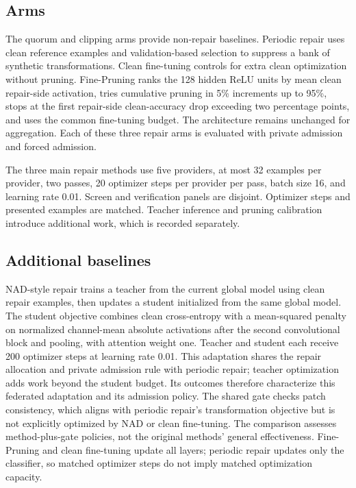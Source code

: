\documentclass[sigconf,review,anonymous]{acmart}
\begin{document}
\subsection{Arms}
The quorum and clipping arms provide non-repair baselines. Periodic repair uses clean reference examples and validation-based selection to suppress a bank of synthetic transformations. Clean fine-tuning controls for extra clean optimization without pruning. Fine-Pruning ranks the 128 hidden ReLU units by mean clean repair-side activation, tries cumulative pruning in 5\% increments up to 95\%, stops at the first repair-side clean-accuracy drop exceeding two percentage points, and uses the common fine-tuning budget. The architecture remains unchanged for aggregation. Each of these three repair arms is evaluated with private admission and forced admission.

The three main repair methods use five providers, at most 32 examples per provider, two passes, 20 optimizer steps per provider per pass, batch size 16, and learning rate 0.01. Screen and verification panels are disjoint. Optimizer steps and presented examples are matched. Teacher inference and pruning calibration introduce additional work, which is recorded separately.

\subsection{Additional baselines}
NAD-style repair trains a teacher from the current global model using clean repair examples, then updates a student initialized from the same global model. The student objective combines clean cross-entropy with a mean-squared penalty on normalized channel-mean absolute activations after the second convolutional block and pooling, with attention weight one. Teacher and student each receive 200 optimizer steps at learning rate 0.01. This adaptation shares the repair allocation and private admission rule with periodic repair; teacher optimization adds work beyond the student budget. Its outcomes therefore characterize this federated adaptation and its admission policy. The shared gate checks patch consistency, which aligns with periodic repair's transformation objective but is not explicitly optimized by NAD or clean fine-tuning. The comparison assesses method-plus-gate policies, not the original methods' general effectiveness. Fine-Pruning and clean fine-tuning update all layers; periodic repair updates only the classifier, so matched optimizer steps do not imply matched optimization capacity.
\end{document}
